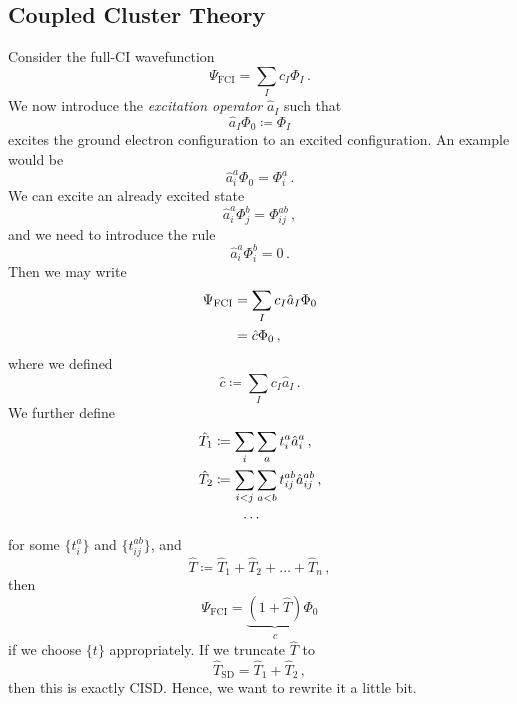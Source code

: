 \documentclass{article}
\theoremstyle{plain}\theoremheaderfont{\normalfont\itshape}\theorembodyfont{\rmfamily}\theoremseparator{.}\newtheorem*{rem}{Remark}\newtheorem*{ex}{Example}\newtheorem*{proof}{Proof}\newtheorem*{altp}{Alternative proof}
\theoremstyle{plain}\theoremheaderfont{\normalfont\bfseries}\theorembodyfont{\rmfamily}\theoremseparator{.}\newtheorem{thm}{Theorem}[section]\newtheorem{lem}[thm]{Lemma}\newtheorem{prop}[thm]{Proposition}\newtheorem*{cor}{Corollary}\newtheorem{defn}[thm]{Definition}\newtheorem{clm}[thm]{Claim}\newtheorem{clminproof}{Claim}
\theoremstyle{break}\theoremheaderfont{\normalfont\itshape}\theorembodyfont{\rmfamily}\theoremseparator{.\medskip}\newtheorem*{proofskip}{Proof}\newtheorem*{exs}{Examples}\newtheorem*{rems}{Remarks}
\theoremstyle{break}\theoremheaderfont{\normalfont\bfseries}\theorembodyfont{\rmfamily}\theoremseparator{.\medskip}\newtheorem{lemskip}[thm]{Lemma}\newtheorem{defnskip}[thm]{Definition}\newtheorem{propskip}[thm]{Proposition}\newtheorem{thmskip}[thm]{Theorem}
\numberwithin{equation}{section}
\begin{document}
    \subsection{Coupled Cluster Theory}
    Consider the full-CI wavefunction
    \begin{equation}
        \Psi_{\text{FCI}}=\sum_I c_I\Phi_I\,.
    \end{equation}
    We now introduce the \textit{excitation operator} \(\hat{a}_I\) such that
    \begin{equation}
        \hat{a}_I\Phi_0\coloneqq\Phi_I
    \end{equation}
    excites the ground electron configuration to an excited configuration. An example would be
    \begin{equation}
        \hat{a}_{i}^{a}\Phi_0=\Phi_{i}^{a}\,.
    \end{equation}
    We can excite an already excited state
    \begin{equation}
        \hat{a}_{i}^{a}\Phi_{j}^{b}=\Phi_{ij}^{ab}\,,
    \end{equation}
    and we need to introduce the rule
    \begin{equation}
        \hat{a}_{i}^{a}\Phi_{i}^{b}=0\,.
    \end{equation}    
    Then we may write
    \begin{align}
        \Psi_{\text{FCI}}&=\sum_{I}c_I\hat{a}_I\Phi_0\notag\\
        &=\hat{c}\Phi_0\,,
    \end{align}
    where we defined
    \begin{equation}
        \hat{c}\coloneqq\sum_I c_I\hat{a}_I\,.
    \end{equation}
    We further define
    \begin{align}
        \hat{T}_1&\coloneqq\sum_{i}\sum_{a}t_{i}^{a}\hat{a}_{i}^{a}\,,\\
        \hat{T}_2&\coloneqq\sum_{i<j}\sum_{a<b}t_{ij}^{ab}\hat{a}_{ij}^{ab}\,,\\
        &\qquad\cdots \notag
    \end{align}
     for some \(\{t_i^a\}\) and \(\{t_{ij}^{ab}\}\), and
    \begin{equation}
        \hat{T}\coloneqq\hat{T}_1+\hat{T}_2+\dots+\hat{T}_n\,,
    \end{equation}
    then
    \begin{equation}
        \Psi_{\text{FCI}}=\underbrace{(1+\hat{T})}_{\hat{c}}\Phi_0
    \end{equation}
    if we choose \(\{t\}\) appropriately. If we truncate \(\hat{T}\) to
    \begin{equation}
        \hat{T}_{\text{SD}}=\hat{T}_1+\hat{T}_2\,,
    \end{equation}
    then this is exactly CISD. Hence, we want to rewrite it a little bit.
\end{document}

